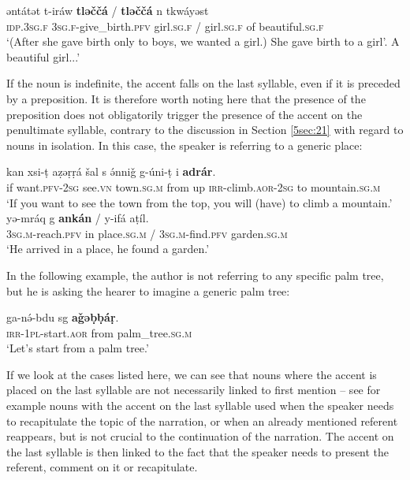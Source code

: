 \documentclass[output=paper]{langsci/langscibook}
\begin{document}
\begin{exe}
\ex\label{5ex:12}
\gll	əntátət	t-iráw	{\textbf{tləččá}}	/  {\textbf{tləččá}}	n	tkwáyəst \\
	{\textsc{idp.3sg.f}}	{\textsc{3sg.f}}-give\_birth.{\textsc{pfv}}	girl.{\textsc{sg.f}}	/  girl.{\textsc{sg.f}}	of	beautiful.{\textsc{sg.f}} \\
\glt	`(After she gave birth only to boys, we wanted a girl.) She gave birth to a girl'. A beautiful girl...'
\end{exe}

If the noun is indefinite, the accent falls on the last syllable, even if it is preceded by a preposition. It is therefore worth noting here that the presence of the preposition does not obligatorily trigger the presence of the accent on the penultimate syllable, contrary to the discussion in Section \ref{5sec:21} with regard to nouns in isolation. In this case, the speaker is referring to a generic place:

\begin{exe}
\ex\label{5ex:13}
\gll	kan xsi-ṭ aẓəṛṛá šal s ə́nniǧ g-úni-ṭ i {\textbf{adrár}}. \\
	if want.{\textsc{pfv-2sg}} see.{\textsc{vn}} town.{\textsc{sg.m}} from up {\textsc{irr}}-climb.{\textsc{aor-2sg}} to mountain.{\textsc{sg.m}} \\
\glt	`If you want to see the town from the top, you will (have) to climb a mountain.'
\ex\label{5ex:14}
\gll	yə-mráq g {\textbf{ankán}} / y-ifá	aṭíl. \\
	{\textsc{3sg.m}}-reach.{\textsc{pfv}} in place.{\textsc{sg.m}} / {\textsc{3sg.m}}-find.{\textsc{pfv}} garden.{\textsc{sg.m}} \\
\glt	`He arrived in a place, he found a garden.'
\end{exe}

In the following example, the author is not referring to any specific palm tree, but he is asking the hearer to imagine a generic palm tree:

\begin{exe}
\ex\label{5ex:15}
\gll	ga-nə́-bdu		sg	{\textbf{aǧəḅḅáṛ}}. \\
	{\textsc{irr-1pl}}-start.{\textsc{aor}} from palm\_tree.{\textsc{sg.m}} \\
\glt	`Let's start from a palm tree.'
\end{exe}

If we look at the cases listed here, we can see that nouns where the accent is placed on the last syllable are not necessarily linked to first mention -- see for example nouns with the accent on the last syllable used when the speaker needs to recapitulate the topic of the narration, or when an already mentioned referent reappears, but is not crucial to the continuation of the narration. The accent on the last syllable is then linked to the fact that the speaker needs to present the referent, comment on it or recapitulate.
\end{document}

